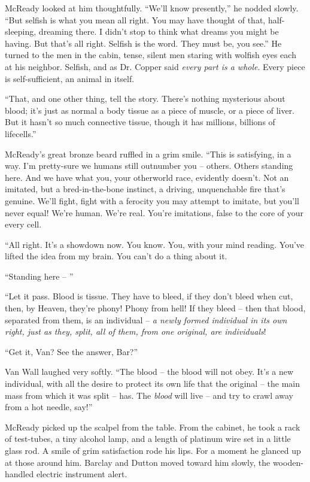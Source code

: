 \documentclass[ebook,oneside,11pt]{memoir}				%
\begin{document}
McReady looked at him thoughtfully. ``We'll know presently,'' he nodded slowly. ``But selfish is what you mean all right. You may have thought of that, half-sleeping, dreaming there. I didn't stop to think what dreams you might be having. But that's all right. Selfish is the word. They must be, you see.'' He turned to the men in the cabin, tense, silent men staring with wolfish eyes each at his neighbor. Selfish, and as Dr. Copper said \emph{every part is a whole}. Every piece is self-sufficient, an animal in itself.

``That, and one other thing, tell the story. There's nothing mysterious about blood; it's just as normal a body tissue as a piece of muscle, or a piece of liver. But it hasn't so much connective tissue, though it has millions, billions of lifecells.''

McReady's great bronze beard ruffled in a grim smile. ``This is satisfying, in a way. I'm pretty-sure we humans still outnumber you -- others. Others standing here. And we have what you, your otherworld race, evidently doesn't. Not an imitated, but a bred-in-the-bone instinct, a driving, unquenchable fire that's genuine. We'll fight, fight with a ferocity you may attempt to imitate, but you'll never equal! We're human. We're real. You're imitations, false to the core of your every cell.

``All right. It's a showdown now. You know. You, with your mind reading. You've lifted the idea from my brain. You can't do a thing about it.

``Standing here -- ''

``Let it pass. Blood is tissue. They have to bleed, if they don't bleed when cut, then, by Heaven, they're phony! Phony from hell! If they bleed -- then that blood, separated from them, is an individual -- \emph{a newly formed individual in its own right, just as they, split, all of them, from one original, are individuals}!

``Get it, Van? See the answer, Bar?''

Van Wall laughed very softly. ``The blood -- the blood will not obey. It's a new individual, with all the desire to protect its own life that the original -- the main mass from which it was split -- has. The \emph{blood} will live -- and try to crawl away from a hot needle, say!''

McReady picked up the scalpel from the table. From the cabinet, he took a rack of test-tubes, a tiny alcohol lamp, and a length of platinum wire set in a little glass rod. A smile of grim satisfaction rode his lips. For a moment he glanced up at those around him. Barclay and Dutton moved toward him slowly, the wooden-handled electric instrument alert.
\end{document}
